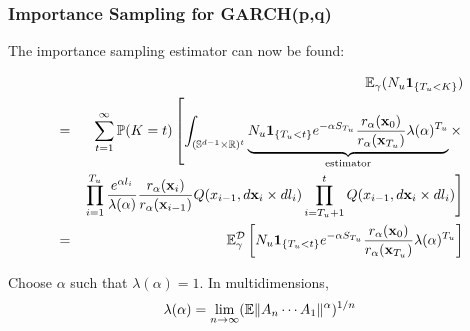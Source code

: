 \documentclass{beamer}
\begin{document}
\begin{frame}
  \frametitle{Importance Sampling for GARCH(p,q)}
  The importance sampling estimator can now be found:
  \begin{scriptsize}
    \begin{eqnarray*}
      && \mathbb{E}_\gamma (N_u \mathbf{1}_{\{T_u < K\}}) \\
      &=&
      \sum_{t=1}^\infty \mathbb{P}(K=t)
      \left[
        \int_{(\mathbb S^{d-1} \times \mathbb R)^{t}}
        \underbrace{
          N_u \mathbf{1}_{\{T_u < t\}} e^{-\alpha S_{T_u}}
          {r_\alpha(\mathbf{x}_{0}) \over r_\alpha(\mathbf{x}_{T_u})}
          \lambda(\alpha)^{T_u}
        }_{\text{estimator}}
        \times \right.\\ 
        && \left.\prod_{i=1}^{T_u}
               {e^{\alpha l_i} \over \lambda(\alpha)}
               {r_\alpha(\mathbf{x}_i) \over r_\alpha(\mathbf{x}_{i-1})}
               Q(x_{i-1}, d\mathbf{x}_{i} \times dl_{i})
               \prod_{i=T_u+1}^{t}
               Q(x_{i-1}, d\mathbf{x}_{i} \times dl_{i})
               \right] \\
      &=&
      \mathbb{E}_\gamma^{\mathcal D}
      \left[
        N_u \mathbf{1}_{\{T_u < t\}} e^{-\alpha S_{T_u}}
        {r_\alpha(\mathbf{x}_{0}) \over r_\alpha(\mathbf{x}_{T_u})}
        \lambda(\alpha)^{T_u}
      \right]
    \end{eqnarray*}
  \end{scriptsize}
  Choose $\alpha$ such that $\lambda(\alpha) = 1$. In multidimensions,
  \[
  \lambda(\alpha) = \lim_{n \to \infty} (\mathbb{E} \|A_n \cdots A_1\|^\alpha)^{1/n}
  \]
\end{frame}
\end{document}
